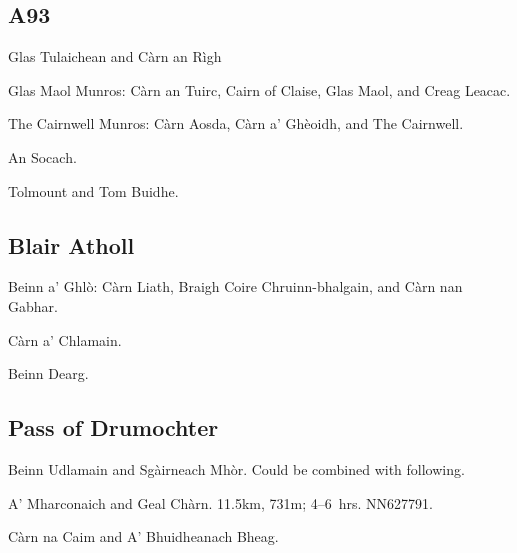\subsection{A93}

\begin{munros}
\item Glas Tulaichean and Càrn an Rìgh

\item
Glas Maol Munros: Càrn an Tuirc, Cairn of Claise, Glas Maol, and Creag Leacac.

\item The Cairnwell Munros: Càrn Aosda, Càrn a' Ghèoidh, and The Cairnwell.

\item An Socach.

\item Tolmount and Tom Buidhe.
\end{munros}



\subsection{Blair Atholl}

\begin{munros}
\item Beinn a' Ghlò: Càrn Liath, Braigh Coire Chruinn-bhalgain, and Càrn nan
  Gabhar.

\item Càrn a' Chlamain.

\item Beinn Dearg. \tick
\end{munros}


\subsection{Pass of Drumochter}

\begin{munros}
\item
Beinn Udlamain and Sgàirneach Mhòr.  Could be combined with following.  \tick

\item
A' Mharconaich and Geal Chàrn.   11.5km, 731m; 4--6~hrs.  NN627791. \tick

\item Càrn na Caim and A' Bhuidheanach Bheag. \tick
\end{munros}

